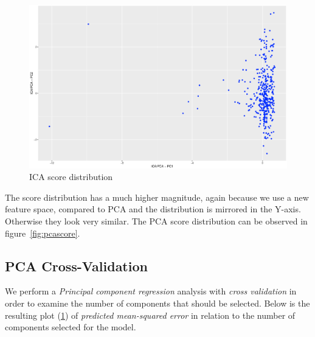 \documentclass[a4paper,12pt]{article}
\begin{document}
        \begin{figure}[H]
            \centering
            \caption{ICA score distribution}
            \label{fig:icascores}
            \includegraphics[width=\textwidth]{share/A2_icascore.eps}
        \end{figure}

        The score distribution has a much higher magnitude, again because we use a new feature space, compared to PCA and the distribution is mirrored in the Y-axis. Otherwise they look very similar. The PCA score distribution can be observed in figure~\ref{fig:pcascore}.
		\subsection*{PCA Cross-Validation}

 		We perform a \emph{Principal component regression} analysis with \emph{cross validation} in order to examine the number of components that should be selected. Below is the resulting plot (\ref{fig:icascores}) of \emph{predicted mean-squared error} in relation to the number of components selected for the model.
        
\end{document}
